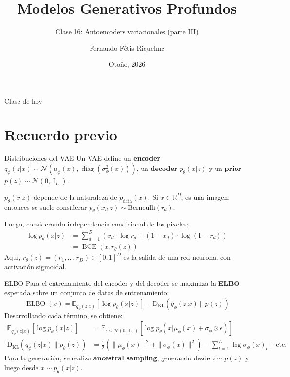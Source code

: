 \documentclass{beamer}
\title{Modelos Generativos Profundos}
\subtitle{Clase 16: Autoencoders variacionales (parte III)}
\author{Fernando Fêtis Riquelme}
\institute{
    Facultad de Ciencias Físicas y Matemáticas\\
    Universidad de Chile
}
\date{Otoño, 2026}
\newcommand{\R}{\mathbb{R}}
\begin{document}
\begin{frame}
    \titlepage
\end{frame}

\begin{frame}{Clase de hoy}
    \tableofcontents
\end{frame}

\section{Recuerdo previo}

\begin{frame}{Distribuciones del VAE}
    Un VAE define un \textbf{encoder} $q_\phi(z|x) \sim \mathcal{N}(\mu_\phi(x), \operatorname{diag}(\sigma^2_\phi(x)))$, un \textbf{decoder} $p_\theta(x|z)$ y un \textbf{prior} $p(z) \sim \mathcal{N}( 0, \operatorname{I}_L)$.

    $p_\theta(x|z)$ depende de la naturaleza de $p_\text{data}(x)$. Si $x\in\R^D$, es una imagen, entonces se suele considerar $p_\theta(x_d|z) \sim \text{Bernoulli}(r_d)$.

    Luego, considerando independencia condicional de los pixeles:
    \begin{align*}
        \log p_\theta(x|z) & = \sum_{d=1}^D \left(x_d\cdot\log r_d + (1-x_d)\cdot\log(1-r_d)\right) \\
                           & = \operatorname{BCE}(x, r_\theta(z))
    \end{align*}
    Aquí, $r_\theta(z)=(r_1,\ldots,r_D)\in[0,1]^D$ es la salida de una red neuronal con activación sigmoidal.
\end{frame}

\begin{frame}{ELBO}
    Para el entrenamiento del encoder y del decoder se maximiza la \textbf{ELBO} esperada sobre un conjunto de datos de entrenamiento:
    \begin{equation*}
        \operatorname{ELBO}(x) = \mathbb{E}_{q_\phi(z|x)}\left[\log p_\theta(x|z)\right] - \operatorname{{D}_{KL}}\left(q_\phi(z|x)\| p(z)\right)
    \end{equation*}
    Desarrollando cada término, se obtiene:
    \begin{align*}
        \mathbb{E}_{q_\phi(z|x)}\left[\log p_\theta(x|z)\right]       & = \mathbb{E}_{\epsilon\sim\mathcal{N}(0,\operatorname{I}_L)}\left[\log p_\theta(x|\mu_\phi(x)+\sigma_\phi\odot \epsilon)\right] \\
        \operatorname{{D}_{KL}}\left(q_\phi(z|x)\| p_\theta(z)\right) & = \frac{1}{2}\left(\|\mu_\phi(x)\|^2 + \|\sigma_\phi(x)\|^2 \right) - \sum_{l=1}^L \log \sigma_\phi(x)_l + \text{cte.}
    \end{align*}
    Para la generación, se realiza \textbf{ancestral sampling}, generando desde $z\sim p(z)$ y luego desde $x\sim p_\theta(x|z)$.
\end{frame}
\end{document}
